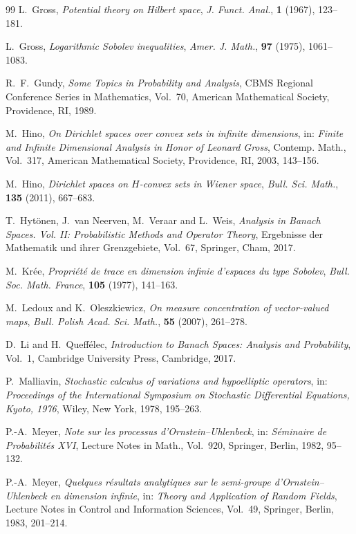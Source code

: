 \documentclass[12pt]{article}
\theoremstyle{plain}
\theoremstyle{definition}
\theoremstyle{remark}
\numberwithin{equation}{section}
\begin{document}
\begin{thebibliography}{99}
L.~Gross,
\emph{Potential theory on Hilbert space},
{\sl J. Funct. Anal.}, \textbf{1} (1967), 123--181.

L.~Gross,
\emph{Logarithmic Sobolev inequalities},
{\sl Amer. J. Math.}, \textbf{97} (1975), 1061--1083.

R.~F.~Gundy,
\emph{Some Topics in Probability and Analysis},
CBMS Regional Conference Series in Mathematics, Vol.~70,
American Mathematical Society, Providence, RI, 1989.

M.~Hino,
\emph{On Dirichlet spaces over convex sets in infinite dimensions},
in: \emph{Finite and Infinite Dimensional Analysis in Honor of
	Leonard Gross},
Contemp. Math., Vol.~317,
American Mathematical Society, Providence, RI, 2003, 143--156.

M.~Hino,
\emph{Dirichlet spaces on $H$-convex sets in Wiener space},
{\sl Bull. Sci. Math.}, \textbf{135} (2011), 667--683.

T.~Hyt\"onen, J.~van Neerven, M.~Veraar and L.~Weis,
\emph{Analysis in Banach Spaces. Vol. II:
	Probabilistic Methods and Operator Theory},
Ergebnisse der Mathematik und ihrer Grenzgebiete, Vol.~67,
Springer, Cham, 2017.

M.~Kr\'ee,
\emph{Propri\'et\'e de trace en dimension infinie d'espaces du type
	Sobolev},
{\sl Bull. Soc. Math. France}, \textbf{105} (1977), 141--163.

M.~Ledoux and K.~Oleszkiewicz,
\emph{On measure concentration of vector-valued maps},
{\sl Bull. Polish Acad. Sci. Math.}, \textbf{55} (2007), 261--278.

D.~Li and H.~Queff\'elec,
\emph{Introduction to Banach Spaces: Analysis and Probability},
Vol.~1, Cambridge University Press, Cambridge, 2017.

P.~Malliavin,
\emph{Stochastic calculus of variations and hypoelliptic operators},
in: \emph{Proceedings of the International Symposium on Stochastic
	Differential Equations, Kyoto, 1976},
Wiley, New York, 1978, 195--263.

P.-A.~Meyer,
\emph{Note sur les processus d'Ornstein--Uhlenbeck},
in: \emph{S\'eminaire de Probabilit\'es XVI},
Lecture Notes in Math., Vol.~920,
Springer, Berlin, 1982, 95--132.

P.-A.~Meyer,
\emph{Quelques r\'esultats analytiques sur le semi-groupe
	d'Ornstein--Uhlenbeck en dimension infinie},
in: \emph{Theory and Application of Random Fields},
Lecture Notes in Control and Information Sciences, Vol.~49,
Springer, Berlin, 1983, 201--214.


\end{thebibliography}
\end{document}
